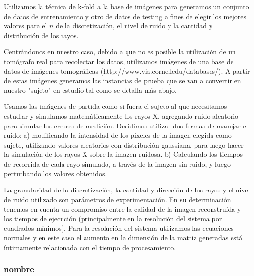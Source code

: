 \par Utilizamos la técnica de k-fold a la base de imágenes para generamos un conjunto de datos de entrenamiento y otro de datos de testing a fines de elegir los mejores valores para el $n$ de la discretización, el nivel de ruido y la cantidad y distribución de los rayos.

\par Centrándonos en nuestro caso, debido a que no es posible la utilización de un tomógrafo real para recolectar los datos, utilizamos imágenes de una base de datos de imágenes tomográficas (http://www.via.cornelledu/databases/). A partir de estas imágenes generamos las instancias de prueba que se van a convertir en nuestro "sujeto" en estudio tal como se detalla más abajo.

\par Usamos las imágenes de partida como si fuera el sujeto al que necesitamos estudiar y simulamos matemáticamente los rayos X, agregando ruido aleatorio para simular los errores de medición. Decidimos utilizar dos formas de manejar el ruido:
a) modificando la intensidad de los pixeles de la imagen elegida como sujeto, utilizando valores aleatorios con distribución gaussiana, para luego hacer la simulación de los rayos X sobre la imagen ruidosa.
b) Calculando los tiempos de recorrida de cada rayo simulado, a través de la imagen sin ruido, y luego perturbando los valores obtenidos.

\par La granularidad de la discretización, la cantidad y dirección de los rayos y el nivel de ruido utilizado son parámetros de experimentación. En su determinación tenemos en cuenta un compromiso entre la calidad de la imagen reconstruída y los tiempos de ejecución (principalmente en la resolución del sistema por cuadrados mínimos). Para la resolución del sistema utilizamos las ecuaciones normales y en este caso el aumento en la dimensión de la matriz generadas está íntimamente relacionada con el tiempo de procesamiento.

\subsubsection*{nombre}
